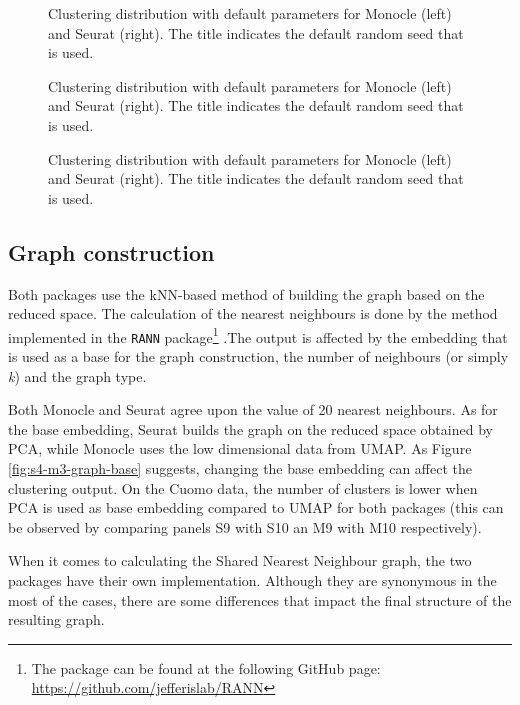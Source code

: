 \begin{figure}[H]
    \centering
    \caption{\label{fig:s4-m3-pca}Clustering distribution with default parameters for Monocle (left) and Seurat (right). The title indicates the default random seed that is used.}
\end{figure}


\begin{figure}[H]
    \centering
    \caption{\label{fig:s4-m3-min-dist}Clustering distribution with default parameters for Monocle (left) and Seurat (right). The title indicates the default random seed that is used.}
\end{figure}

\begin{figure}[H]
    \centering
    \caption{\label{fig:s4-m3-n-neigh-umap}Clustering distribution with default parameters for Monocle (left) and Seurat (right). The title indicates the default random seed that is used.}
\end{figure}

\subsection{Graph construction}
Both packages use the kNN-based method of building the graph based on the reduced space. The calculation of the nearest neighbours is done by the method implemented in the \verb|RANN| package\footnote{The package can be found at the following GitHub page: \url{https://github.com/jefferislab/RANN}} .The output is affected by the embedding that is used as a base for the graph construction, the number of neighbours (or simply \textit{k}) and the graph type.

Both Monocle and Seurat agree upon the value of 20 nearest neighbours. As for the base embedding, Seurat builds the graph on the reduced space obtained by PCA, while Monocle uses the low dimensional data from UMAP. As Figure \ref{fig:s4-m3-graph-base} suggests, changing the base embedding can affect the clustering output. On the Cuomo data, the number of clusters is lower when PCA is used as base embedding compared to UMAP for both packages (this can be observed by comparing panels S9 with S10 an M9 with M10 respectively).

When it comes to calculating the Shared Nearest Neighbour graph, the two packages have their own implementation. Although they are synonymous in the most of the cases, there are some differences that impact the final structure of the resulting graph.

